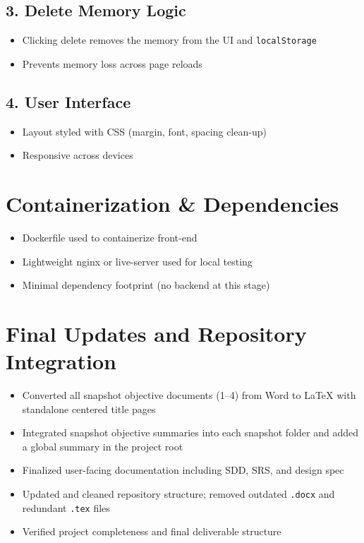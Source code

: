 \documentclass[12pt]{article}
\begin{document}
\subsection*{3. Delete Memory Logic}
\begin{itemize}
  \item Clicking delete removes the memory from the UI and \texttt{localStorage}
  \item Prevents memory loss across page reloads
\end{itemize}

\subsection*{4. User Interface}
\begin{itemize}
  \item Layout styled with CSS (margin, font, spacing clean-up)
  \item Responsive across devices
\end{itemize}

\section{Containerization \& Dependencies}
\begin{itemize}
  \item Dockerfile used to containerize front-end
  \item Lightweight nginx or live-server used for local testing
  \item Minimal dependency footprint (no backend at this stage)
\end{itemize}

\section{Final Updates and Repository Integration}

\begin{itemize}
  \item Converted all snapshot objective documents (1--4) from Word to LaTeX with standalone centered title pages
  \item Integrated snapshot objective summaries into each snapshot folder and added a global summary in the project root
  \item Finalized user-facing documentation including SDD, SRS, and design spec
  \item Updated and cleaned repository structure; removed outdated \texttt{.docx} and redundant \texttt{.tex} files
  \item Verified project completeness and final deliverable structure
\end{itemize}
\end{document}
